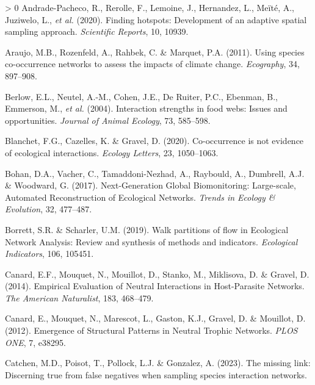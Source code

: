 \documentclass[11pt]{article}
\newlength{\cslhangindent}
\newenvironment{CSLReferences}[3] %
 {%
  \setlength{\parindent}{0pt}
  \ifodd #1 \everypar{\setlength{\hangindent}{\cslhangindent}}\ignorespaces\fi
  \ifnum #2 > 0
  \setlength{\parskip}{#2\baselineskip}
  \fi
 }%
 {}
\begin{document}
\hypertarget{refs}{}
\begin{CSLReferences}{1}{0}
\leavevmode\hypertarget{ref-Andrade-Pacheco2020Finding}{}%
Andrade-Pacheco, R., Rerolle, F., Lemoine, J., Hernandez, L., Meïté, A.,
Juziwelo, L., \emph{et al.} (2020). Finding hotspots: Development of an
adaptive spatial sampling approach. \emph{Scientific Reports}, 10,
10939.

\leavevmode\hypertarget{ref-Araujo2011Usinga}{}%
Araujo, M.B., Rozenfeld, A., Rahbek, C. \& Marquet, P.A. (2011). Using
species co-occurrence networks to assess the impacts of climate change.
\emph{Ecography}, 34, 897--908.

\leavevmode\hypertarget{ref-Berlow2004Interaction}{}%
Berlow, E.L., Neutel, A.-M., Cohen, J.E., De Ruiter, P.C., Ebenman, B.,
Emmerson, M., \emph{et al.} (2004). Interaction strengths in food webs:
Issues and opportunities. \emph{Journal of Animal Ecology}, 73,
585--598.

\leavevmode\hypertarget{ref-Blanchet2020Cooccurrencea}{}%
Blanchet, F.G., Cazelles, K. \& Gravel, D. (2020). Co-occurrence is not
evidence of ecological interactions. \emph{Ecology Letters}, 23,
1050--1063.

\leavevmode\hypertarget{ref-Bohan2017NexGlo}{}%
Bohan, D.A., Vacher, C., Tamaddoni-Nezhad, A., Raybould, A., Dumbrell,
A.J. \& Woodward, G. (2017). Next-Generation Global Biomonitoring:
Large-scale, Automated Reconstruction of Ecological Networks.
\emph{Trends in Ecology \& Evolution}, 32, 477--487.

\leavevmode\hypertarget{ref-Borrett2019Walk}{}%
Borrett, S.R. \& Scharler, U.M. (2019). Walk partitions of flow in
Ecological Network Analysis: Review and synthesis of methods and
indicators. \emph{Ecological Indicators}, 106, 105451.

\leavevmode\hypertarget{ref-Canard2014Empiricala}{}%
Canard, E.F., Mouquet, N., Mouillot, D., Stanko, M., Miklisova, D. \&
Gravel, D. (2014). Empirical Evaluation of Neutral Interactions in
Host-Parasite Networks. \emph{The American Naturalist}, 183, 468--479.

\leavevmode\hypertarget{ref-Canard2012Emergencea}{}%
Canard, E., Mouquet, N., Marescot, L., Gaston, K.J., Gravel, D. \&
Mouillot, D. (2012). Emergence of Structural Patterns in Neutral Trophic
Networks. \emph{PLOS ONE}, 7, e38295.

\leavevmode\hypertarget{ref-Catchen2023Missinga}{}%
Catchen, M.D., Poisot, T., Pollock, L.J. \& Gonzalez, A. (2023). The
missing link: Discerning true from false negatives when sampling species
interaction networks.


\end{CSLReferences}
\end{document}
